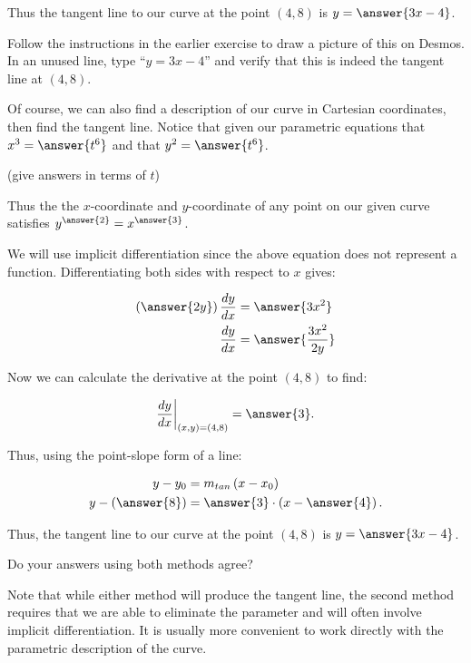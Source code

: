 \documentclass{ximera}
\begin{document}
\begin{exercise}
\begin{exercise}
Thus the tangent line to our curve at the point $(4, 8)$ is $y=\answer{3x-4}$. 

\begin{exercise}
Follow the instructions in the earlier exercise to draw a picture of this on Desmos. In an unused line, type ``$y=3x-4$'' and verify that this is indeed the tangent line at $(4,8)$.
\end{exercise}
\end{exercise}
\begin{exercise}
Of course, we can also find a description of our curve in Cartesian coordinates, then find the tangent line.  Notice that given our parametric equations that $x^3=\answer{t^6}$ and that $y^2=\answer{t^6}$.

(give answers in terms of $t$)

Thus the the $x$-coordinate and $y$-coordinate of any point on our given curve satisfies $y^{\answer{2}}=x^{\answer{3}}$. 

We will use implicit differentiation since the above equation does not represent a function.  Differentiating both sides with respect to $x$ gives:

\begin{align*}
\left(\answer{2y}\right)\frac{dy}{dx} &= \answer{3x^2} \\
\frac{dy}{dx} &= \answer{\frac{3x^2}{2y}}
\end{align*}

\begin{exercise}
Now we can calculate the derivative at the point $(4,8)$ to find:

\[
\frac{dy}{dx}\bigg|_{(x,y)=(4,8)} = \answer{3}.
\]

Thus, using the point-slope form of a line:

\begin{align*}
y-y_0& = m_{tan}\left(x-x_0\right) \\
y-\left(\answer{8}\right)& =\answer{3} \cdot \left(x-\answer{4}\right). \\
\end{align*}

Thus, the tangent line to our curve at the point $(4, 8)$ is $y=\answer{3x-4}$. 

Do your answers using both methods agree?

\begin{multipleChoice}
\end{multipleChoice}

\begin{feedback}[correct]
Note that while either method will produce the tangent line, the second method requires that we are able to eliminate the parameter and will often involve implicit differentiation.  It is usually more convenient to work directly with the parametric description of the curve.
\end{feedback}

\end{exercise}
\end{exercise}


\end{exercise}
\end{document}
